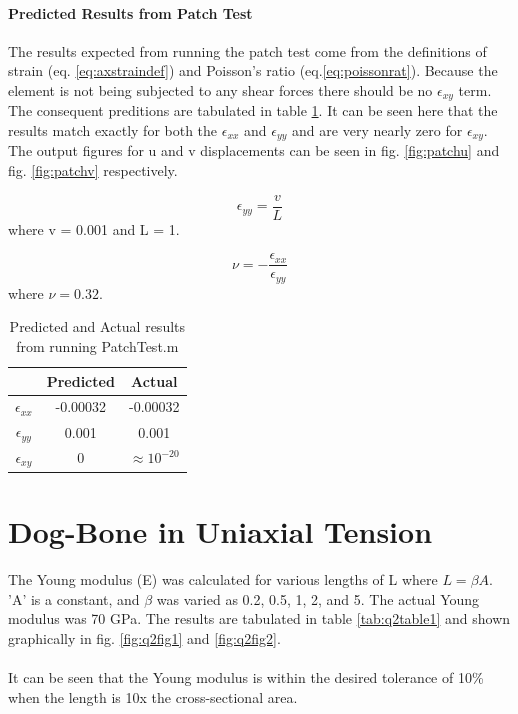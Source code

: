 \documentclass[paper=letter, fontsize=11pt]{scrartcl} %
\numberwithin{equation}{section} %
\numberwithin{figure}{section} %
\numberwithin{table}{section} %
\begin{document}
\paragraph{Predicted Results from Patch Test}
The results expected from running the patch test come from the definitions of strain (eq. \ref{eq:axstraindef}) and Poisson's ratio (eq.\ref{eq:poissonrat}). Because the element is not being subjected to any shear forces there should be no $\epsilon_{xy}$ term. The consequent preditions are tabulated in table \ref{tab:patchtab}. It can be seen here that the results match exactly for both the $\epsilon_{xx}$ and $\epsilon_{yy}$ and are very nearly zero for $\epsilon_{xy}$. The output figures for u and v displacements can be seen in fig. \ref{fig:patchu} and fig. \ref{fig:patchv} respectively.

\begin{equation} \label{eq:axstraindef}
\epsilon_{yy} = \frac{v}{L}
\end{equation}
where v = 0.001 and L = 1. 

\begin{equation} \label{eq:poissonrat}
\nu = - \frac{\epsilon_{xx}}{\epsilon_{yy}}
\end{equation}
where $\nu = 0.32$.

\begin{table}[h]
\centering
	\begin{tabular}{c c c}
		& Predicted & Actual \\
		\hline
		$\epsilon_{xx}$ & -0.00032 & -0.00032 \\
		$\epsilon_{yy}$ & 0.001 & 0.001 \\
		$\epsilon_{xy}$ & 0 & $\approx 10^{-20}$ \\
		\hline
	\end{tabular}
\caption{Predicted and Actual results from running PatchTest.m}
\label{tab:patchtab}
\end{table}
	

\pagebreak
\section{Dog-Bone in Uniaxial Tension}

The Young modulus (E) was calculated for various lengths of L where $L = \beta A$. 'A' is a constant, and $\beta$ was varied as 0.2, 0.5, 1, 2, and 5. The actual Young modulus was 70 GPa. The results are tabulated in table \ref{tab:q2table1} and shown graphically in fig. \ref{fig:q2fig1} and \ref{fig:q2fig2}. \\
\\
It can be seen that the Young modulus is within the desired tolerance of 10\% when the length is 10x the cross-sectional area. \\
\\
\end{document}
